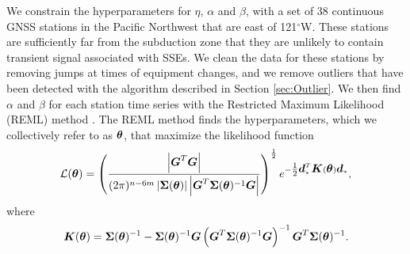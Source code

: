 \documentclass[extra,mreferee]{gji}
\begin{document}
We constrain the hyperparameters for $\eta$, $\alpha$ and $\beta$, with a set of 38 continuous GNSS stations in the Pacific Northwest that are east of 121$^\circ$W.  These stations are sufficiently far from the subduction zone that they are unlikely to contain transient signal associated with SSEs.  We clean the data for these stations by removing jumps at times of equipment changes, and we remove outliers that have been detected with the algorithm described in Section \ref{sec:Outlier}. We then find $\alpha$ and $\beta$ for each station time series with the Restricted Maximum Likelihood (REML) method \cite[e.g.,][]{Harville1974,Cressie1992,Hines2017}. The REML method finds the hyperparameters, which we collectively refer to as $\mitbf{\theta}$, that maximize the likelihood function
\begin{equation}\label{eq:REML}
\mathcal{L}(\mitbf{\theta}) = \left(\frac{\left|\mitbf{G}^T\mitbf{G}\right|}
                           {(2\pi)^{n-6m} 
                           \left| \mitbf{\Sigma}(\mitbf{\theta}) \right| 
                           \left| \mitbf{G}^T\mitbf{\Sigma}(\mitbf{\theta})^{-1}\mitbf{G} \right|}\right)^{\frac{1}{2}} 
                           e^{-\tfrac{1}{2}\mitbf{d}_*^T\mitbf{K}(\mitbf{\theta})\mitbf{d}_*},
\end{equation}
where
\begin{equation}
\mitbf{K}(\mitbf{\theta}) = \mitbf{\Sigma}(\mitbf{\theta})^{-1} - 
                      \mitbf{\Sigma}(\mitbf{\theta})^{-1}\mitbf{G}
         \left(\mitbf{G}^T\mitbf{\Sigma}(\mitbf{\theta})^{-1}\mitbf{G}\right)^{-1}
         \mitbf{G}^T\mitbf{\Sigma}(\mitbf{\theta})^{-1}.
\end{equation}
\end{document}
